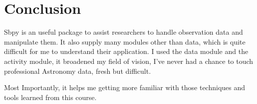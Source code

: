 \documentclass{report}
\begin{document}
\chapter{Conclusion}
Sbpy is an useful package to assist researchers to handle observation data and manipulate them.
It also supply many modules other than data, which is quite difficult for me to understand their application. I used the data module and the activity module, it broadened my field of vision, I've never had a chance to touch professional Astronomy data, fresh but difficult.

Most Importantly, it helps me getting more familiar with those techniques and tools learned from this course.



\end{document}
